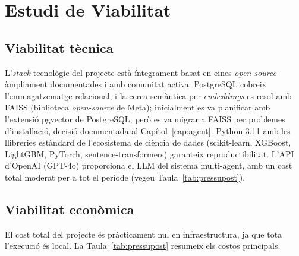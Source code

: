 \documentclass[12pt, a4paper]{report}
\begin{document}
\chapter{Estudi de Viabilitat}

\section{Viabilitat tècnica}

L'\textit{stack} tecnològic del projecte està íntegrament basat en eines \textit{open-source} àmpliament documentades i amb comunitat activa. PostgreSQL cobreix l'emmagatzematge relacional, i la cerca semàntica per \textit{embeddings} es resol amb FAISS (biblioteca \textit{open-source} de Meta); inicialment es va planificar amb l'extensió pgvector de PostgreSQL, però es va migrar a FAISS per problemes d'instal\textperiodcentered{}lació, decisió documentada al Capítol~\ref{cap:agent}. Python 3.11 amb les llibreries estàndard de l'ecosistema de ciència de dades (scikit-learn, XGBoost, LightGBM, PyTorch, sentence-transformers) garanteix reproductibilitat. L'API d'OpenAI (GPT-4o) proporciona el LLM del sistema multi-agent, amb un cost total moderat per a tot el període (vegeu Taula~\ref{tab:pressupost}).

\section{Viabilitat econòmica}

El cost total del projecte és pràcticament nul en infraestructura, ja que tota l'execució és local. La Taula~\ref{tab:pressupost} resumeix els costos principals.
\end{document}
